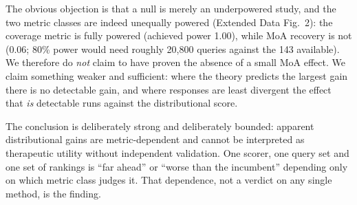 \documentclass[11pt,letterpaper]{article}
\begin{document}
The obvious objection is that a null is merely an underpowered study, and the two metric
classes are indeed unequally powered (Extended Data Fig.~2): the coverage metric is fully
powered (achieved power 1.00), while MoA recovery is not (0.06; 80\% power would need roughly
20,800 queries against the 143 available). We therefore do \emph{not} claim to have proven the
absence of a small MoA effect. We claim something weaker and sufficient: where the theory
predicts the largest gain there is no detectable gain, and where responses are least divergent
the effect that \emph{is} detectable runs against the distributional score.

The conclusion is deliberately strong and deliberately bounded: apparent
distributional gains are metric-dependent and cannot be interpreted as therapeutic
utility without independent validation. One scorer, one query set and one set of
rankings is ``far ahead'' or ``worse than the incumbent'' depending only on which metric
class judges it. That dependence, not a verdict on any single method, is the finding.
\end{document}
